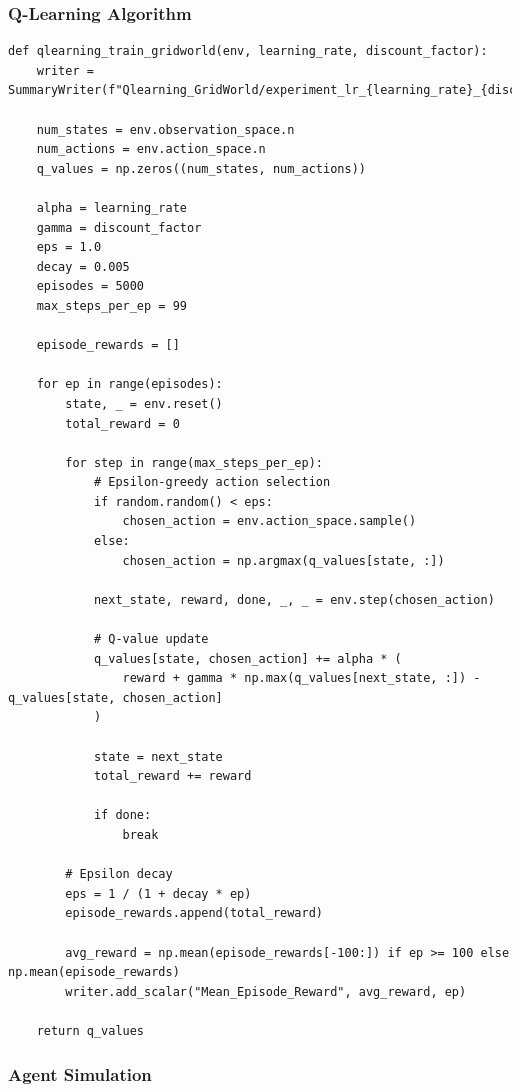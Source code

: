\documentclass[12pt]{article}
\begin{document}
{{{\subsubsection{Q-Learning Algorithm}

\begin{verbatim}
def qlearning_train_gridworld(env, learning_rate, discount_factor):
    writer = SummaryWriter(f"Qlearning_GridWorld/experiment_lr_{learning_rate}_{discount_factor}")
    
    num_states = env.observation_space.n
    num_actions = env.action_space.n
    q_values = np.zeros((num_states, num_actions))
    
    alpha = learning_rate
    gamma = discount_factor
    eps = 1.0
    decay = 0.005
    episodes = 5000
    max_steps_per_ep = 99
    
    episode_rewards = []
    
    for ep in range(episodes):
        state, _ = env.reset()
        total_reward = 0
    
        for step in range(max_steps_per_ep):
            # Epsilon-greedy action selection
            if random.random() < eps:
                chosen_action = env.action_space.sample()
            else:
                chosen_action = np.argmax(q_values[state, :])
            
            next_state, reward, done, _, _ = env.step(chosen_action)
            
            # Q-value update
            q_values[state, chosen_action] += alpha * (
                reward + gamma * np.max(q_values[next_state, :]) - q_values[state, chosen_action]
            )
    
            state = next_state
            total_reward += reward
    
            if done:
                break
    
        # Epsilon decay
        eps = 1 / (1 + decay * ep)
        episode_rewards.append(total_reward)
        
        avg_reward = np.mean(episode_rewards[-100:]) if ep >= 100 else np.mean(episode_rewards)
        writer.add_scalar("Mean_Episode_Reward", avg_reward, ep)
    
    return q_values
\end{verbatim}

\subsubsection{Agent Simulation}

}}}
\end{document}
